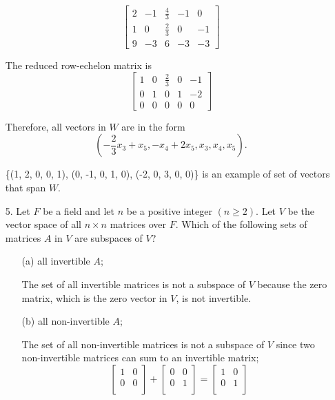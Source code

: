 \documentclass{article}
\begin{document}
\begin{enumerate}[listparindent=\parindent]
\[
    \begin{bmatrix}
        2 & -1 & \frac{4}{3} & -1 & 0 \\
        1 & 0 & \frac{2}{3} & 0 & -1 \\
        9 & -3 & 6 & -3 & -3
    \end{bmatrix}
\]

The reduced row-echelon matrix is
\[
    \begin{bmatrix}
        1 & 0 & \frac{2}{3} & 0 & -1 \\
        0 & 1 & 0 & 1 & -2 \\
        0 & 0 & 0 & 0 & 0
    \end{bmatrix}
\]

Therefore, all vectors in \(W\) are in the form
\[ (-\frac{2}{3}x_3 + x_5, -x_4 + 2x_5, x_3, x_4, x_5). \]

\{(1, 2, 0, 0, 1), (0, -1, 0, 1, 0), (-2, 0, 3, 0, 0)\}
is an example of set of vectors that span \(W\).

\item[5.] Let \(F\) be a field and let \(n\) be a positive integer \((n \geq 2)\).
    Let \(V\) be the vector space of all \(n \times n\) matrices over \(F\).
    Which of the following sets of matrices \(A\) in \(V\) are subspaces of \(V\)?
    \begin{enumerate}[listparindent=\parindent]
        \item[(a)] all invertible \(A\);

            The set of all invertible matrices is not a subspace of \(V\)
            because the zero matrix, which is the zero vector in \(V\), is not invertible.

        \item[(b)] all non-invertible \(A\);

            The set of all non-invertible matrices is not a subspace of \(V\)
            since two non-invertible matrices can sum to an invertible matrix;
            \[
                \begin{bmatrix}
                    1 & 0 \\
                    0 & 0 \\
                \end{bmatrix}
                +
                \begin{bmatrix}
                    0 & 0 \\
                    0 & 1 \\
                \end{bmatrix}
                =
                \begin{bmatrix}
                    1 & 0 \\
                    0 & 1 \\
                \end{bmatrix}
            \]


\end{enumerate}
\end{enumerate}
\end{document}
